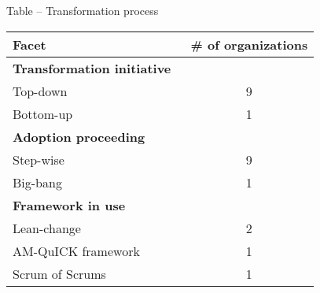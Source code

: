 \centering
Table – Transformation process

\begin{tabular}{ l c }
    \bfseries{Facet} & \bfseries{\# of organizations} \\
    \hline
    \bfseries{Transformation initiative} \\
    Top-down & 9 \\
    Bottom-up & 1 \\
    \hline
    \bfseries{Adoption proceeding} \\
    Step-wise & 9 \\
    Big-bang & 1 \\
    \hline
    \bfseries{Framework in use} \\
    Lean-change & 2 \\
    AM-QuICK framework & 1 \\
    Scrum of Scrums & 1 \\
\end{tabular}
\justify
